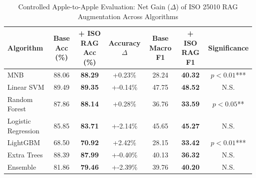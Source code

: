 \begin{table}[htbp]
\centering
\caption{Controlled Apple-to-Apple Evaluation: Net Gain ($\Delta$) of ISO 25010 RAG Augmentation Across Algorithms}
\begin{tabular}{lcccccc}
\toprule
\textbf{Algorithm} & \textbf{Base Acc (\%)} & \textbf{+ ISO RAG Acc (\%)} & \textbf{Accuracy } $\Delta$ & \textbf{Base Macro F1} & \textbf{+ ISO RAG F1} & \textbf{Significance} \\
\midrule
MNB & 88.06 & \textbf{88.29} & +0.23\% & 28.24 & \textbf{40.32} & $p < 0.01$*** \\
Linear SVM & 89.49 & \textbf{89.35} & +-0.14\% & 47.75 & \textbf{48.52} & N.S. \\
Random Forest & 87.86 & \textbf{88.14} & +0.28\% & 36.76 & \textbf{33.59} & $p < 0.05$** \\
Logistic Regression & 85.85 & \textbf{83.71} & +-2.14\% & 45.65 & \textbf{45.27} & N.S. \\
LightGBM & 68.50 & \textbf{70.92} & +2.42\% & 28.15 & \textbf{33.42} & $p < 0.01$*** \\
Extra Trees & 88.39 & \textbf{87.99} & +-0.40\% & 40.13 & \textbf{36.32} & N.S. \\
Ensemble & 81.86 & \textbf{79.46} & +-2.39\% & 39.76 & \textbf{40.20} & N.S. \\
\bottomrule
\end{tabular}
\end{table}

